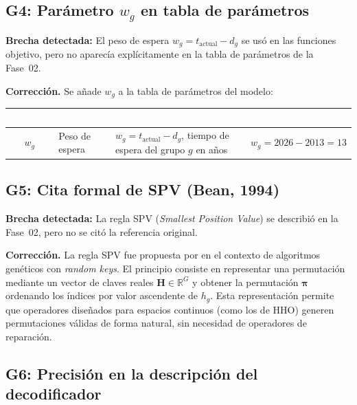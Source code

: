 \documentclass[12pt,letterpaper]{article}
\begin{document}
\subsection{G4: Parámetro $w_g$ en tabla de parámetros}

\begin{notebox}
\textbf{Brecha detectada:} El peso de espera $w_g = t_{\text{actual}} - d_g$ se usó en las funciones objetivo, pero no aparecía explícitamente en la tabla de parámetros de la Fase~02.
\end{notebox}

\textbf{Corrección.} Se añade $w_g$ a la tabla de parámetros del modelo:

\begin{table}[H]
\centering
\renewcommand{\arraystretch}{1.3}
\begin{tabular}{clp{6cm}l}
\toprule
\rowcolor{tablehead}
\textcolor{white}{\textbf{Símbolo}} & \textcolor{white}{\textbf{Nombre}} & \textcolor{white}{\textbf{Descripción}} & \textcolor{white}{\textbf{Ejemplo}} \\
\midrule
$w_g$ & Peso de espera & $w_g = t_{\text{actual}} - d_g$, tiempo de espera del grupo $g$ en años & $w_g = 2026 - 2013 = 13$ \\
\bottomrule
\end{tabular}
\end{table}

\subsection{G5: Cita formal de SPV (Bean, 1994)}

\begin{notebox}
\textbf{Brecha detectada:} La regla SPV (\textit{Smallest Position Value}) se describió en la Fase~02, pero no se citó la referencia original.
\end{notebox}

\textbf{Corrección.} La regla SPV fue propuesta por \textcite{bean1994} en el contexto de algoritmos genéticos con \textit{random keys}. El principio consiste en representar una permutación mediante un vector de claves reales $\mathbf{H} \in \mathbb{R}^G$ y obtener la permutación $\boldsymbol{\pi}$ ordenando los índices por valor ascendente de $h_g$. Esta representación permite que operadores diseñados para espacios continuos (como los de HHO) generen permutaciones válidas de forma natural, sin necesidad de operadores de reparación.

\subsection{G6: Precisión en la descripción del decodificador}
\end{document}
